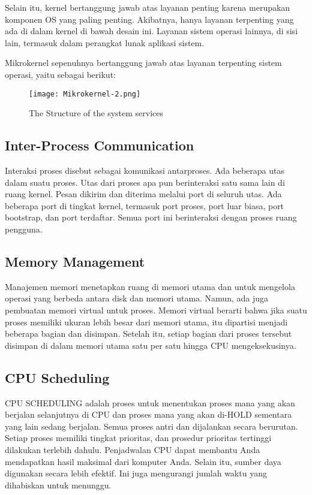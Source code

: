 	Selain itu, kernel bertanggung jawab atas layanan penting karena merupakan komponen OS yang paling penting. Akibatnya, hanya layanan terpenting yang ada di dalam kernel di bawah desain ini. Layanan sistem operasi lainnya, di sisi lain, termasuk dalam perangkat lunak aplikasi sistem.
	
	Mikrokernel sepenuhnya bertanggung jawab atas layanan terpenting sistem operasi, yaitu sebagai berikut:
	
	\begin{figure}
		\centering
		\texttt{[image: Mikrokernel-2.png]}
		\caption{The Structure of the system services}
	\end{figure}
	
	\subsection*{Inter-Process Communication}
	
	Interaksi proses disebut sebagai komunikasi antarproses. Ada beberapa utas dalam suatu proses. Utas dari proses apa pun berinteraksi satu sama lain di ruang kernel. Pesan dikirim dan diterima melalui port di seluruh utas. Ada beberapa port di tingkat kernel, termasuk port proses, port luar biasa, port bootstrap, dan port terdaftar. Semua port ini berinteraksi dengan proses ruang pengguna.
	
	\subsection*{Memory Management}
	
	Manajemen memori menetapkan ruang di memori utama dan untuk mengelola operasi yang berbeda antara disk dan memori utama. Namun, ada juga pembuatan memori virtual untuk proses. Memori virtual berarti bahwa jika suatu proses memiliki ukuran lebih besar dari memori utama, itu dipartisi menjadi beberapa bagian dan disimpan. Setelah itu, setiap bagian dari proses tersebut disimpan di dalam memori utama satu per satu hingga CPU mengeksekusinya.
	
	\subsection*{CPU Scheduling}
	
	CPU SCHEDULING adalah proses untuk menentukan proses mana yang akan berjalan selanjutnya di CPU dan proses mana yang akan di-HOLD sementara yang lain sedang berjalan. Semua proses antri dan dijalankan secara berurutan. Setiap proses memiliki tingkat prioritas, dan prosedur prioritas tertinggi dilakukan terlebih dahulu. Penjadwalan CPU dapat membantu Anda mendapatkan hasil maksimal dari komputer Anda. Selain itu, sumber daya digunakan secara lebih efektif. Ini juga mengurangi jumlah waktu yang dihabiskan untuk menunggu.
	

